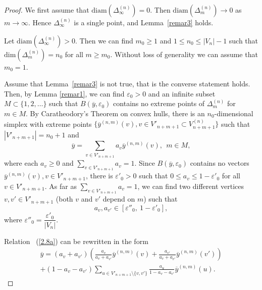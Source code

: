 \documentclass[11pt, english, reqno]{amsart}
\theoremstyle{definition}
\theoremstyle{remark}
\theoremstyle{plain}
\def\ov{\overline}
\numberwithin{equation}{section}
\begin{document}
\begin{proof}
We first assume that $\mathrm{diam}(\Delta_{\infty}^{(n)}) = 0$. Then
$\mathrm{diam}(\Delta_m^{(n)})\to 0$ as $m \to \infty$.
Hence $\Delta_{\infty}^{(n)}$ is a single point, and Lemma~\ref{remar3}
holds.

Let $\mathrm{diam}(\Delta_{\infty}^{(n)}) > 0$. Then  we can find
$m_0 \geq 1$ and $1 \leq n_0 \leq |V_n| - 1$ such that $\mathrm{dim}
 (\Delta_m^{(n)}) = n_0$ for all $m \geq m_0$. Without loss of generality
 we can assume that $m_0 = 1$.

Assume that Lemma~\ref{remar3} is not true, that is the converse
 statement holds. Then, by Lemma
\ref{remar1},  we can find $\varepsilon_0 > 0$ and an infinite
 subset $M \subset \{1,2,\ldots\}$ such that $B(\ov y, \varepsilon_0)$
 contains no extreme points of  $\Delta_{m}^{(n)}$ for $m \in M$. By
 Caratheodory's Theorem on convex hulls, there is an $n_0$-dimensional
 simplex with extreme points $\{\ov y^{(n,m)}(v), v \in V'_{n+m+1} \subset
 V^{(n)}_{n+m+1}\}$ such that $|V'_{n+m+1}| = n_0 + 1$ and
\begin{equation}\label{2.8a}
\ov y = \sum_{v \in V'_{n+m+1}} a_v \ov y^{(n,m)}(v),\ \ m \in M,
\end{equation}
where each $a_v \geq 0$ and $\sum_{v \in V'_{n+m+1}} a_v = 1$. Since
 $B(\ov y, \varepsilon_0)$ contains no vectors $\ov y^{(n,m)}(v), v \in
 V'_{n+m+1}$, there is $\varepsilon'_0 > 0$ such that $0 \leq a_v \leq 1
 - \varepsilon'_0$ for all $v \in V'_{n+m+1}$. As far as $\sum_{v \in
 V'_{n+m+1}} a_v = 1$, we can find two different vertices $v, v'
 \in V'_{n+m+1}$ (both $v$ and $v'$ depend on $m$) such that
\begin{equation*}\label{2.8b}
a_v, a_{v'} \in [\varepsilon''_0, \ 1 - \varepsilon'_0],
\end{equation*}
where $\varepsilon''_0 = \dfrac{\varepsilon'_0}{|V_n|}$.

Relation ~(\ref{2.8a}) can be rewritten in the form
\begin{multline}\label{2.8c}
\ov y = (a_v + a_{v'})\left(\frac{a_v}{a_v + a_{v'}} \ov y^{(n,m)}(v) +
 \frac{a_{v'}}{a_v + a_{v'}} \ov y^{(n,m)}(v')\right)  \\
 +(1 - a_v - a_{v'}) \sum_{u \in  V'_{n+m+1} \setminus \{v,v'\}}
  \frac{a_u}{1 - a_v - a_{v'}} \ov y^{(n,m)}(u).
\end{multline}


\end{proof}
\end{document}
